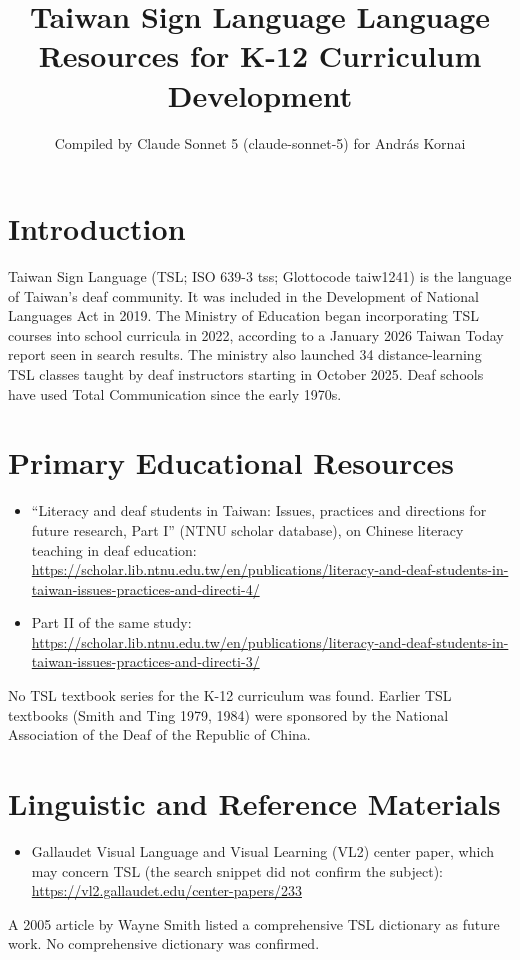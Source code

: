 \documentclass[12pt]{article}
\title{Taiwan Sign Language Language Resources for K-12 Curriculum Development}
\author{Compiled by Claude Sonnet 5 (claude-sonnet-5) for Andr\'as Kornai}
\date{}
\begin{document}
\maketitle

\section{Introduction}
Taiwan Sign Language (TSL; ISO 639-3 tss; Glottocode taiw1241) is the language of Taiwan's deaf community. It was included in the Development of National Languages Act in 2019. The Ministry of Education began incorporating TSL courses into school curricula in 2022, according to a January 2026 Taiwan Today report seen in search results. The ministry also launched 34 distance-learning TSL classes taught by deaf instructors starting in October 2025. Deaf schools have used Total Communication since the early 1970s.

\section{Primary Educational Resources}
\begin{itemize}
\item ``Literacy and deaf students in Taiwan: Issues, practices and directions for future research, Part I'' (NTNU scholar database), on Chinese literacy teaching in deaf education: \url{https://scholar.lib.ntnu.edu.tw/en/publications/literacy-and-deaf-students-in-taiwan-issues-practices-and-directi-4/}
\item Part II of the same study: \url{https://scholar.lib.ntnu.edu.tw/en/publications/literacy-and-deaf-students-in-taiwan-issues-practices-and-directi-3/}
\end{itemize}
No TSL textbook series for the K-12 curriculum was found. Earlier TSL textbooks (Smith and Ting 1979, 1984) were sponsored by the National Association of the Deaf of the Republic of China.

\section{Linguistic and Reference Materials}
\begin{itemize}
\item Gallaudet Visual Language and Visual Learning (VL2) center paper, which may concern TSL (the search snippet did not confirm the subject): \url{https://vl2.gallaudet.edu/center-papers/233}
\end{itemize}
A 2005 article by Wayne Smith listed a comprehensive TSL dictionary as future work. No comprehensive dictionary was confirmed.
\end{document}
